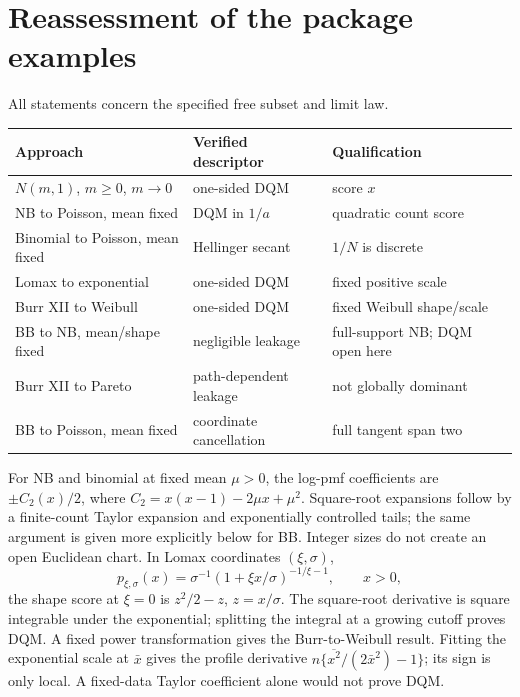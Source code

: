 \documentclass[11pt]{article}
\theoremstyle{definition}
\theoremstyle{remark}
\begin{document}
\section{Reassessment of the package examples}
All statements concern the specified free subset and limit law.
\begin{center}\small
\begin{tabular}{@{}lll@{}}
\toprule
Approach & Verified descriptor & Qualification \\
\midrule
$N(m,1)$, $m\ge0$, $m\to0$ & one-sided DQM & score $x$ \\
NB to Poisson, mean fixed & DQM in $1/a$ & quadratic count score \\
Binomial to Poisson, mean fixed & Hellinger secant & $1/N$ is discrete \\
Lomax to exponential & one-sided DQM & fixed positive scale \\
Burr XII to Weibull & one-sided DQM & fixed Weibull shape/scale \\
BB to NB, mean/shape fixed & negligible leakage & full-support NB; DQM open here \\
Burr XII to Pareto & path-dependent leakage & not globally dominant \\
BB to Poisson, mean fixed & coordinate cancellation & full tangent span two \\
\bottomrule
\end{tabular}\end{center}
For NB and binomial at fixed mean $\mu>0$, the log-pmf coefficients are
$\pm C_2(x)/2$, where $C_2=x(x-1)-2\mu x+\mu^2$. Square-root expansions
follow by a finite-count Taylor expansion and exponentially controlled tails;
the same argument is given more explicitly below for BB. Integer sizes do not
create an open Euclidean chart. In Lomax coordinates $(\xi,\sigma)$,
\[
 p_{\xi,\sigma}(x)=\sigma^{-1}(1+\xi x/\sigma)^{-1/\xi-1},\qquad x>0,
\]
the shape score at $\xi=0$ is $z^2/2-z$, $z=x/\sigma$.
The square-root derivative is square integrable under the exponential;
splitting the integral at a growing cutoff proves DQM. A fixed power
transformation gives the Burr-to-Weibull result. Fitting the exponential scale
at $\bar x$ gives the profile derivative
$n\{\overline{x^2}/(2\bar x^2)-1\}$; its sign is only local. A fixed-data
Taylor coefficient alone would not prove DQM.
\end{document}
